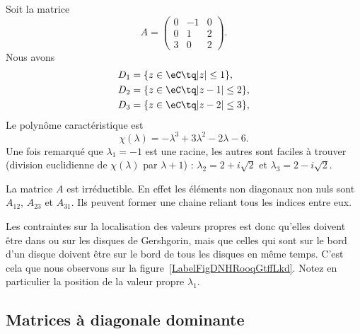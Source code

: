\begin{example}     \label{EXooDQYDooPxqHjZ}
	Soit la matrice
	\begin{equation}
		A=\begin{pmatrix}
			0 & -1 & 0 \\
			0 & 1  & 2 \\
			3 & 0  & 2
		\end{pmatrix}.
	\end{equation}
	Nous avons
	\begin{subequations}
		\begin{align}
			D_1 & =\{ z\in \eC\tq | z |\leq 1 \},   \\
			D_2 & =\{ z\in \eC\tq | z-1 |\leq 2 \}, \\
			D_3 & =\{ z\in \eC\tq | z-2 |\leq 3 \},
		\end{align}
	\end{subequations}
	Le polynôme caractéristique est
	\begin{equation}
		\chi(\lambda)=-\lambda^3+3\lambda^2-2\lambda-6.
	\end{equation}
	Une fois remarqué que \( \lambda_1=-1\) est une racine, les autres sont faciles à trouver (division euclidienne de \( \chi(\lambda)\) par \( \lambda+1\)) : \( \lambda_2=2+i\sqrt{2}\) et \( \lambda_3=2-i\sqrt{ 2 }\).

	La matrice \( A\) est irréductible. En effet les éléments non diagonaux non nuls sont \( A_{12}\), \( A_{23}\) et \( A_{31}\). Ils peuvent former une chaine reliant tous les indices entre eux.

	Les contraintes sur la localisation des valeurs propres est donc qu'elles doivent être dans ou sur les disques de Gershgorin, mais que celles qui sont sur le bord d'un disque doivent être sur le bord de tous les disques en même temps. C'est cela que nous observons sur la figure~\ref{LabelFigDNHRooqGtffLkd}. Notez en particulier la position de la valeur propre \( \lambda_1\).


	\newcommand{\CaptionFigDNHRooqGtffLkd}{Les disques de Gershgorin et les valeurs propres pour l'exemple~\ref{EXooDQYDooPxqHjZ}.}
	

\end{example}

\subsection{Matrices à diagonale dominante}

